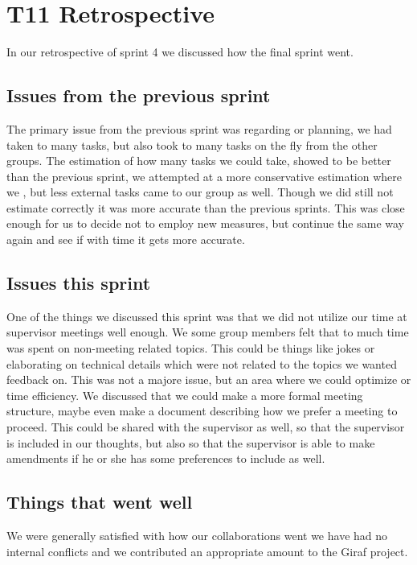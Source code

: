 \section{\gls{T11} Retrospective}

In our retrospective of sprint 4 we discussed how the final sprint went.

\subsection{Issues from the previous sprint}
The primary issue from the previous sprint was regarding or planning, we had taken to many tasks, but also took to many tasks on the fly from the other groups.
The estimation of how many tasks we could take, showed to be better than the previous sprint, we attempted at a more conservative estimation where we , but less external tasks came to our group as well. Though we did still not estimate correctly it was more accurate than the previous  sprints. This was close enough for us to decide not to employ new measures, but continue the same way again and see if with time it gets more accurate.

\subsection{Issues this sprint}
One of the things we discussed this sprint was that we did not utilize our time at supervisor meetings well enough. We some group members felt that to much time was spent on non-meeting related topics. This could be things like jokes or elaborating on technical details which were not related to the topics we wanted feedback on. This was not a majore issue, but an area where we could optimize or time efficiency.
We discussed that we could make a more formal meeting structure, maybe even make a document describing how we prefer a meeting to proceed. This could be shared with the supervisor as well, so that the supervisor is included in our thoughts, but also so that the supervisor is able to make amendments if he or she has some preferences to include as well.

\subsection{Things that went well}
We were generally satisfied with how our collaborations went we have had no internal conflicts and we contributed  an appropriate amount to the Giraf project. 
